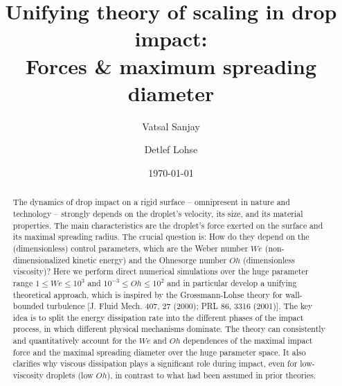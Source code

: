 \documentclass[preprint,amssymb,superscriptaddress,aps,prl,floatfix]{revtex4-1}
\begin{document}

\title{Unifying theory of scaling in drop impact:\\ Forces \& maximum spreading diameter}%

\author{Vatsal Sanjay}
\author{Detlef Lohse}

\date{\today}


\begin{abstract}
The dynamics of drop impact on  a rigid surface 
-- omnipresent in nature and technology -- 
strongly depends on the droplet's velocity, its size, and 
its material properties. The main characteristics are the droplet's force exerted on the surface
and its maximal spreading radius. The crucial question is: How do they depend on the 
(dimensionless) control parameters, which are the Weber number $We$ (non-dimensionalized kinetic energy) and the Ohnesorge number $Oh$ (dimensionless viscosity)? Here we perform direct numerical simulations
over the huge parameter range $1\le We \le 10^3$ and $10^{-3}\le Oh \le 10^2$ and in particular develop a unifying theoretical approach, which is inspired by the Grossmann-Lohse theory
for wall-bounded turbulence [J. Fluid Mech. 407, 27 (2000); PRL 86, 3316 (2001)].
The key idea is to split the energy dissipation rate into the different phases 
of the impact process, in which different physical mechanisms  dominate. The theory can
consistently and quantitatively 
account for the $We$ and $Oh$ dependences of the maximal impact force and the maximal
spreading diameter over the huge parameter space.
It also clarifies why viscous dissipation plays a significant role during impact, even for
low-viscosity droplets (low $Oh$),  in contrast to what had been assumed in prior theories. 
	
\end{abstract}
\end{document}
